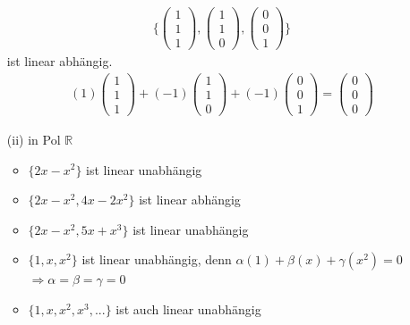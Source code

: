 \documentclass[11pt]{report}
\newcommand*\Zb[1] {\mathbb{#1}}
\begin{document}
\begin{itemize}
\begin{align}
 \{\begin{pmatrix} 1 \\ 1 \\ 1 \end{pmatrix}, \begin{pmatrix} 1 \\ 1 \\ 0 \end{pmatrix}, \begin{pmatrix} 0 \\ 0 \\ 1 \end{pmatrix}\}
\end{align}
ist linear abhängig.
\begin{align}
 (1)\begin{pmatrix} 1 \\ 1 \\ 1 \end{pmatrix} + (-1)\begin{pmatrix} 1 \\ 1 \\ 0 \end{pmatrix} + (-1)\begin{pmatrix} 0 \\ 0 \\ 1 \end{pmatrix} = \begin{pmatrix} 0 \\ 0 \\ 0 \end{pmatrix}
\end{align}

 \item[(ii)] in Pol $\Zb{R}$
\begin{itemize}
 \item $\{2x-x^2\}$ ist linear unabhängig
 \item $\{2x-x^2, 4x-2x^2\}$ ist linear abhängig
 \item $\{2x-x^2, 5x+x^3\}$ ist linear unabhängig
 \item $\{1, x, x^2\}$ ist linear unabhängig, denn $\alpha(1) + \beta(x) + \gamma(x^2) = 0$ \\ $\Rightarrow \alpha = \beta = \gamma = 0$ 
 \item $\{1, x, x^2, x^3, ...\}$ ist auch linear unabhängig
\end{itemize}
\end{itemize}
\end{document}
